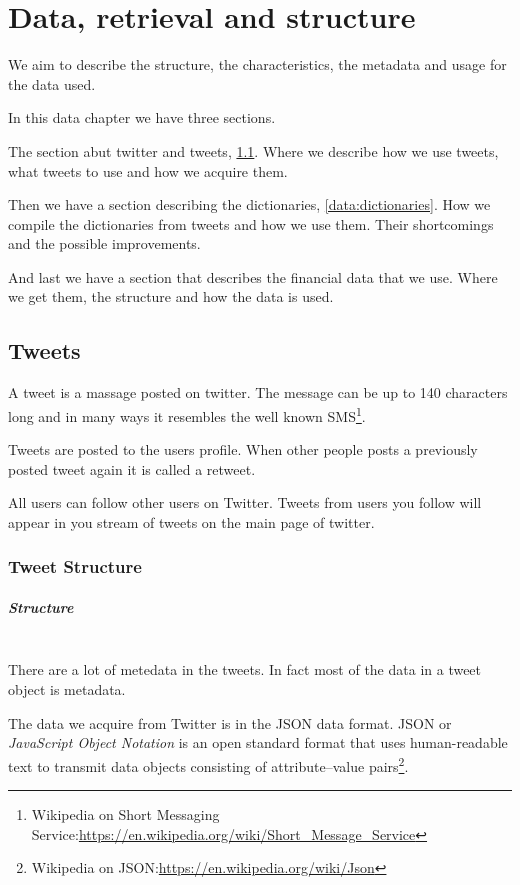 \chapter{Data, retrieval and structure}
We aim to describe the structure, the characteristics, the metadata and usage
for the data used. 

In this data chapter we have three sections. 

The section abut twitter and tweets, \ref{data:tweets}. Where we describe how we
use tweets, what tweets to use and how we acquire them.

Then we have a section describing the dictionaries, \ref{data:dictionaries}. How
we compile the dictionaries from tweets and how we use them. Their shortcomings
and the possible improvements.  

And last we have a section that describes the financial data that we use. Where
we get them, the structure and how the data is used. 
%

\section{Tweets}\label{data:tweets}
A tweet is a massage posted on twitter. The message can be up to 140 characters
long and in many ways it resembles the well known
SMS\footnote{Wikipedia on Short Messaging Service:\url{https://en.wikipedia.org/wiki/Short_Message_Service}}.

Tweets are posted to the users profile. When other people posts a previously
posted tweet again it is called a retweet.

All users can follow other users on Twitter. Tweets from users you follow will
appear in you stream of tweets on the main page of twitter.
%

\subsection{Tweet Structure}
\paragraph{Structure}
\hspace{0pt}\\
There are a lot of metedata in the tweets. In fact most of the data in a tweet
object is metadata. 

The data we acquire from Twitter is in the JSON data format. JSON or \textit{JavaScript
Object Notation} is an open standard format that uses human-readable text to
transmit data objects consisting of attribute–value
pairs\footnote{Wikipedia on JSON:\url{https://en.wikipedia.org/wiki/Json}}.


